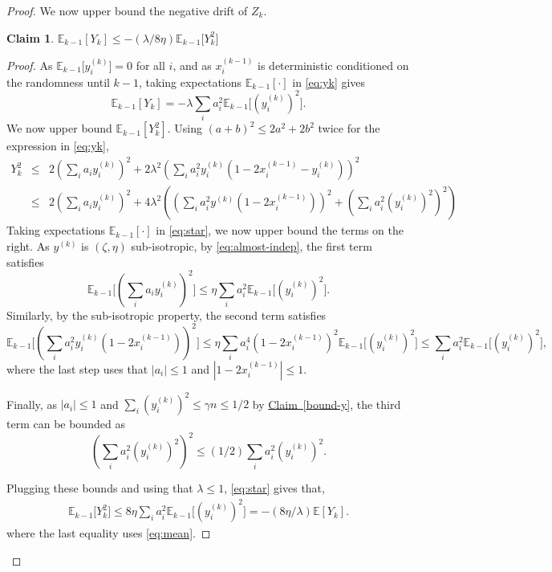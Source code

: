 \documentclass[11pt]{article}
\newcommand{\E}{\mathbb{E}}
\newtheorem{claim}[theorem]{Claim}
\theoremstyle{definition}
\newcommand{\expref}[2]{\texorpdfstring{\hyperref[#2]{#1~\ref{#2}}}{#1~\ref{#2}}}
\begin{document}
\begin{proof}
We now upper bound the negative drift of $Z_k$.
\begin{claim}
\label{cool-calc}
$  \E_{k-1}[Y_k] \leq - (\lambda/8 \eta)  \E_{k-1}\big[Y_k^2 \big] $
\end{claim}
\begin{proof}
As $\E_{k-1}\big[y_i^{(k)}\big]=0$ for all $i$, and as $x_i^{(k-1)}$ is deterministic conditioned on the randomness until $k-1$,  taking expectations $\E_{k-1}[\cdot ]$ in \eqref{eq:yk} gives
\begin{equation}
    \label{eq:mean}
 \E_{k-1}[Y_k] = -\lambda \sum_i a_i^2 \E_{k-1}\big[(y_i^{(k)})^2\big].
\end{equation}
We now upper bound $\E_{k-1}[Y_k^2]$.
Using $(a+b)^2 \leq 2 a^2 + 2b^2$ twice for the expression in \eqref{eq:yk},
\begin{eqnarray}
Y_k^2  & \leq &  2 (\sum_i a_i y_i^{(k)})^2
+ 2   \lambda^2 \left(\sum_i a_i^2  y_i^{(k)} (1- 2  x_i^{(k-1)} - y_i^{(k)}) \right)^2 \nonumber \\
 & \leq &   2 (\sum_i a_i y_i^{(k)})^2 + 4 \lambda^2 \left( \left(\sum_i a_i^2 y^{(k)} (1- 2  x_i^{(k-1)}) \right)^2  + \left(\sum_i a_i^2  (y_i^{(k)})^2 \right)^2 \right)  \label{eq:star}
%
\end{eqnarray}
%
%
%
Taking expectations $\E_{k-1}[\cdot ]$ in \eqref{eq:star}, we now upper bound the terms on the right.
%
%
%
%
%
As $y^{(k)}$ is $(\zeta,\eta)$ sub-isotropic, by \eqref{eq:almost-indep}, the first term satisfies
\[\E_{k-1}\Big[(\sum_i a_i y_i^{(k)})^2 \Big] \leq \eta \sum_i a_i^2
\E_{k-1}\big[(y_i^{(k)})^2\big].\]
Similarly, by the sub-isotropic property, the second term satisfies
\[ \E_{k-1}\Big[(\sum_i a_i^2 y_i^{(k)} (1-2x_i^{(k-1)}))^2 \Big]  \leq   \eta \sum_i a_i^4 (1-2x_i^{(k-1)})^2  \E_{k-1}
\big[(y_i^{(k)})^2\big]  \leq   \sum_i a_i^2 \E_{k-1}
\big[(y_i^{(k)})^2\big],\]
%
where the last step uses that $|a_i|\leq 1$ and $|1-2x_i^{(k-1)}| \leq 1$.
%
%

Finally, as $|a_i| \leq 1$ and $\sum_i (y_i^{(k)})^2 \leq \gamma n \leq 1/2$ by \expref{Claim}{bound-y}, the third term can be bounded as
\begin{equation}
\label{eq:star1}
 \left(\sum_i a_i^2  (y_i^{(k)})^2\right)^2 \leq  (1/2 ) \sum_i a_i^2  (y_i^{(k)})^2.
\end{equation}

Plugging these bounds and using that $\lambda \leq 1$, \eqref{eq:star} gives that,
 \begin{eqnarray*}
 \E_{k-1}\big[Y_k^2\big]  \leq   8 \eta \sum_i a_i^2 \E_{k-1}\big[(y_i^{(k)})^2\big]  =  - (8 \eta/\lambda)  \E[Y_k].
\end{eqnarray*}
where the last equality uses \eqref{eq:mean}.
%
%
\end{proof}


\end{proof}
\end{document}
